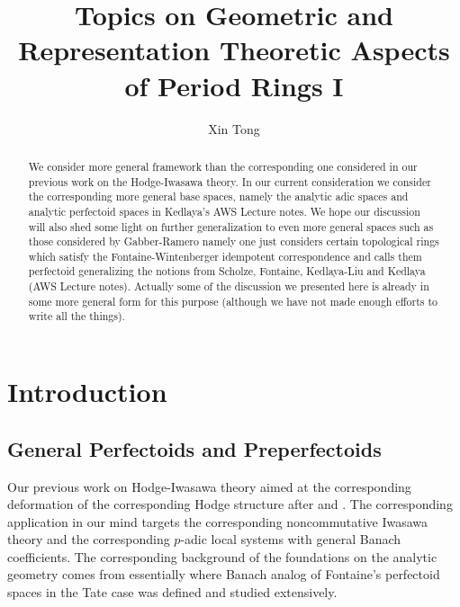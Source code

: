 \documentclass[12pt]{amsart}
\theoremstyle{definition}
\numberwithin{equation}{section}
\begin{document}
\normalfont



\title{Topics on Geometric and Representation Theoretic Aspects of Period Rings I}
\author{Xin Tong}



\maketitle


\begin{abstract}
\rm We consider more general framework than the corresponding one considered in our previous work on the Hodge-Iwasawa theory. In our current consideration we consider the corresponding more general base spaces, namely the analytic adic spaces and analytic perfectoid spaces in Kedlaya's AWS Lecture notes. We hope our discussion will also shed some light on further generalization to even more general spaces such as those considered by Gabber-Ramero namely one just considers certain topological rings which satisfy the Fontaine-Wintenberger idempotent correspondence and calls them perfectoid generalizing the notions from Scholze, Fontaine, Kedlaya-Liu and Kedlaya (AWS Lecture notes). Actually some of the discussion we presented here is already in some more general form for this purpose (although we have not made enough efforts to write all the things). 
\end{abstract}


\newpage

\tableofcontents


\newpage



\section{Introduction}

\subsection{General Perfectoids and Preperfectoids}

\noindent Our previous work on Hodge-Iwasawa theory aimed at the corresponding deformation of the corresponding Hodge structure after \cite{KL1} and \cite{KL2}. The corresponding application in our mind targets the corresponding noncommutative Iwasawa theory and the corresponding $p$-adic local systems with general Banach coefficients. The corresponding background of the foundations on the analytic geometry comes from essentially \cite{KL1} where Banach analog of Fontaine's perfectoid spaces in the Tate case was defined and studied extensively. \\
\end{document}
